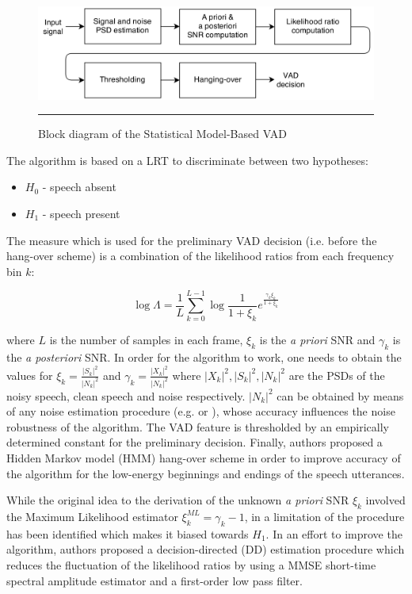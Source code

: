 \begin{figure}[htbp]
	\centering
		\includegraphics[width=0.9\columnwidth]{Figures/Sohn.png}
		\rule{37em}{0.5pt}
	\caption[Block diagram of the Statistical Model-Based VAD]{Block diagram of the Statistical Model-Based VAD \cite{Sohn}}
	\label{fig:Sohn}
\end{figure}

The algorithm is based on a LRT to discriminate between two hypotheses:
\begin{itemize}
\item[] $H_0$ - speech absent
\item[] $H_1$ - speech present
\end{itemize}

The measure which is used for the preliminary VAD decision (i.e. before the hang-over scheme) is a combination of the likelihood ratios from each frequency bin $k$:

\begin{equation}
\log \Lambda = \frac{1}{L} \sum_{k=0}^{L-1} \log \frac{1}{1+\xi_k} e^{\frac{\gamma_k\xi_k}{1+\xi_k}}
\end{equation}

where $L$ is the number of samples in each frame, $\xi_k$ is the \emph{a priori} SNR and $\gamma_k$ is the \emph{a posteriori} SNR. In order for the algorithm to work, one needs to obtain the values for $\xi_k = \frac{\left | S_k \right |^{2}}{\left | N_k \right |^{2}}$ and $\gamma_k = \frac{\left | X_k \right |^{2}}{\left | N_k \right |^{2}}$ where $\left | X_k \right |^{2}, \left | S_k \right |^{2}, \left | N_k \right |^{2}$ are the PSDs of the noisy speech, clean speech and noise respectively. $\left | N_k \right |^{2}$ can be obtained by means of any noise estimation procedure (e.g. \cite{MSnoise} or \cite{MMSEnoise}), whose accuracy influences the noise robustness of the algorithm. The VAD feature is thresholded by an empirically determined constant for the preliminary decision. Finally, authors proposed a Hidden Markov model (HMM) hang-over scheme in order to improve accuracy of the algorithm for the low-energy beginnings and endings of the speech utterances.

While the original idea to the derivation of the unknown \emph{a priori} SNR $\xi_k$ involved the Maximum Likelihood estimator $\xi_k^{ML} = \gamma_k - 1$, in \cite{Sohn} a limitation of the procedure has been identified which makes it biased towards $H_1$. In an effort to improve the algorithm, authors proposed a decision-directed (DD) estimation procedure which reduces the fluctuation of the likelihood ratios by using a MMSE short-time spectral amplitude estimator \cite{Ephraim} and a first-order low pass filter.

